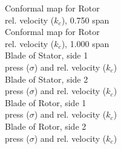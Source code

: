 \documentclass[10pt,a4paper]{article}
\begin{document}
\newpage
{\huge Conformal map for Rotor}\\ rel. velocity ($k_c$), 0.750 span \\
\newpage
{\huge Conformal map for Rotor}\\ rel. velocity ($k_c$), 1.000 span \\
\newpage
{\huge Blade of Stator, side 1}\\ press ($\sigma$) and rel. velocity ($k_c$)\\
\newpage
{\huge Blade of Stator, side 2}\\ press ($\sigma$)  and rel. velocity ($k_c$)\\
\newpage
{\huge Blade of Rotor, side 1}\\ press ($\sigma$) and rel. velocity ($k_c$)\\
\newpage
{\huge Blade of Rotor, side 2}\\ press ($\sigma$)  and rel. velocity ($k_c$)\\
\end{document}
